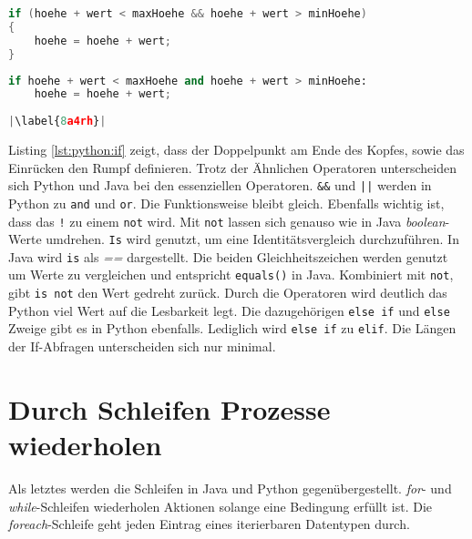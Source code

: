\begin{minipage}{.5\linewidth}
\begin{lstlisting}[language=java,caption={If-Abfrage in Java},captionpos=b,label={lst:java:if},frame=none]
if (hoehe + wert < maxHoehe && hoehe + wert > minHoehe)
{
    hoehe = hoehe + wert;
}
\end{lstlisting}
\end{minipage}
\begin{minipage}{.5\linewidth}
\begin{lstlisting}[language=python,caption={If-Abfrage in Python},captionpos=b,label={lst:python:if},frame=l,escapechar=|]
if hoehe + wert < maxHoehe and hoehe + wert > minHoehe:
    hoehe = hoehe + wert;
    
|\label{8a4rh}|
\end{lstlisting}
\end{minipage}

Listing \ref{lst:python:if} zeigt, dass der Doppelpunkt am Ende des Kopfes, sowie das Einrücken den Rumpf definieren.
Trotz der Ähnlichen Operatoren unterscheiden sich Python und Java bei den essenziellen Operatoren. \texttt{\&\&} und \texttt{||} werden in Python zu \texttt{and} und \texttt{or}. Die Funktionsweise bleibt gleich. Ebenfalls wichtig ist, dass das \texttt{!} zu einem \texttt{not} wird. Mit \texttt{not} lassen sich genauso wie in Java \textit{boolean}-Werte umdrehen. \texttt{Is} wird genutzt, um eine Identitätsvergleich durchzuführen. In Java wird \texttt{is} als \textit{==} dargestellt. Die beiden Gleichheitszeichen werden genutzt um Werte zu vergleichen und entspricht \texttt{equals()} in Java. Kombiniert mit \texttt{not}, gibt \texttt{is not} den Wert gedreht zurück. Durch die Operatoren wird deutlich das Python viel Wert auf die Lesbarkeit legt.
Die dazugehörigen \texttt{else if} und \texttt{else} Zweige gibt es in Python ebenfalls. Lediglich wird \texttt{else if} zu \texttt{elif}.  Die Längen der If-Abfragen unterscheiden sich nur minimal.\cite{Python3:Buch}\cite{Louis:2010}\par

\section{Durch Schleifen Prozesse wiederholen}
Als letztes werden die Schleifen in Java und Python gegenübergestellt. \textit{for}- und \textit{while}-Schleifen wiederholen Aktionen solange eine Bedingung erfüllt ist. Die \textit{foreach}-Schleife geht jeden Eintrag eines iterierbaren Datentypen durch.

